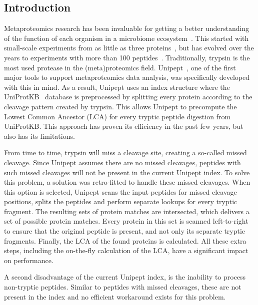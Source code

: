 \documentclass[11pt]{article}
\begin{document}
    \begin{multicols}{2}
        \section{Introduction}\label{sec:introduction}
        Metaproteomics research has been invaluable for getting a better understanding of the function of each organism in a microbiome ecosystem~\cite{metaproteomics}.
        This started with small-scale experiments from as little as three proteins~\cite{small_experiment_metaproteomics}, but has evolved over the years to experiments with more than 100 peptides~\cite{large_experiment1_metaproteomics, large_experiment2_metaproteomics}.
        Traditionally, trypsin is the most used protease in the (meta)proteomics field.
        Unipept~\cite{unipept_desktop, unipept_api, unipept_4, unipept_orig, unipept_tutorial, unipept_web, unipept_cli, unipept_desktop_2}, one of the first major tools to support metaproteomics data analysis, was specifically developed with this in mind.
        As a result, Unipept uses an index structure where the UniProtKB~\cite{UniprotKB} database is preprocessed by splitting every protein according to the cleavage pattern created by trypsin.
        This allows Unipept to precompute the Lowest Common Ancestor (LCA) for every tryptic peptide digestion from UniProtKB\@.
        This approach has proven its efficiency in the past few years, but also has its limitations.

        From time to time, trypsin will miss a cleavage site, creating a so-called missed cleavage.
        Since Unipept assumes there are no missed cleavages, peptides with such missed cleavages will not be present in the current Unipept index.
        To solve this problem, a solution was retro-fitted to handle these missed cleavages.
        When this option is selected, Unipept scans the input peptides for missed cleavage positions, splits the peptides and perform separate lookups for every tryptic fragment.
        The resulting sets of protein matches are intersected, which delivers a set of possible protein matches.
        Every protein in this set is scanned left-to-right to ensure that the original peptide is present, and not only its separate tryptic fragments.
        Finally, the LCA of the found proteins is calculated.
        All these extra steps, including the on-the-fly calculation of the LCA, have a significant impact on performance.

        A second disadvantage of the current Unipept index, is the inability to process non-tryptic peptides.
        Similar to peptides with missed cleavages, these are not present in the index and no efficient workaround exists for this problem.


\end{multicols}
\end{document}
